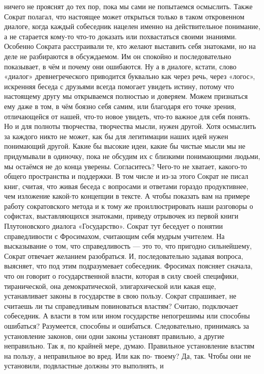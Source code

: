 ничего не прояснят до тех пор, пока мы сами не попытаемся осмыслить. Также
Сократ полагал, что настоящее может открыться только в таком откровенном
диалоге, когда каждый собеседник нацелен именно на действительное понимание, а
не старается кому-то что-то доказать или похвастаться своими знаниями. Особенно
Сократа расстраивали те, кто желают выставить себя знатоками, но на деле не
разбираются в обсуждаемом. Им он спокойно и последовательно показывает, в чём и
почему они ошибаются. Ну а в диалоге, кстати, слово «диалог» древнегреческого
приводится буквально как через речь, через «логос», искренняя беседа с друзьями
всегда помогает увидеть истину, потому что настоящему другу мы открываемся
полностью и доверяем. Можем признаться ему даже в том, в чём боязно себя самим,
или благодаря его точке зрения, отличающейся от нашей, что-то новое увидеть,
что-то важное для себя понять. Но и для полноты творчества, творчества мысли,
нужен другой. Хотя осмыслить за каждого никто не может, как бы для легитимации
наших идей нужен понимающий другой. Какие бы высокие идеи, какие бы чистые мысли
мы не придумывали в одиночку, пока не обсудим их с близкими понимающими людьми,
мы остаёмся не до конца уверены. Согласитесь? Чего-то не хватает, какого-то
общего пространства и поддержки. В том числе и из-за этого Сократ не писал книг,
считая, что живая беседа с вопросами и ответами гораздо продуктивнее, чем
изложение какой-то концепции в тексте. А чтобы показать вам на примере работу
сократовского метода и к тому же проиллюстрировать наши разговоры о софистах,
выставляющихся знатоками, приведу отрывочек из первой книги Плутоновского
диалога «Государство». Сократ тут беседует о понятии справедливости с
Фросимахом, считающим себя мудрым учителем. На высказывание о том, что
справедливость — это то, что пригодно сильнейшему, Сократ отвечает желанием
разобраться. И, последовательно задавая вопроса, выясняет, что под этим
подразумевает собеседник. Фросимах поясняет сначала, что он говорит о
государственной власти, которая в силу своей специфики, тиранической, она
демократической, элигархической или какая еще, устанавливает законы в
государстве в свою пользу. Сократ спрашивает, не считаешь ли ты справедливым
повиноваться властям? Считаю, подключает собеседник. А власти в том или ином
государстве непогрешимы или способны ошибаться? Разумеется, способны и
ошибаться. Следовательно, принимаясь за установление законов, они одни законы
установят правильно, а другие неправильно. Так я, по крайней мере, думаю.
Правильное установление властям на пользу, а неправильное во вред. Или как по-
твоему? Да, так. Чтобы они не установили, подвластные должны это выполнять, и
